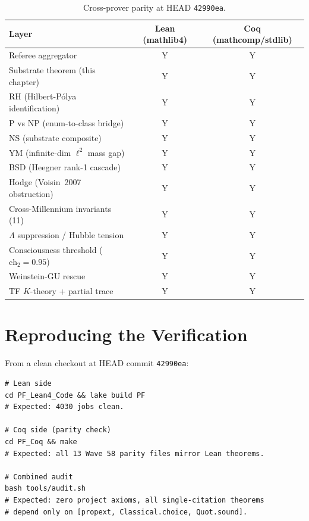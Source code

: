\begin{table}[h]
\centering
\small
\caption{Cross-prover parity at HEAD \texttt{42990ea}.}
\begin{tabular}{lcc}
\toprule
\textbf{Layer} & \textbf{Lean (mathlib4)} & \textbf{Coq (mathcomp/stdlib)} \\
\midrule
Referee aggregator                       & Y & Y \\
Substrate theorem (this chapter)         & Y & Y \\
RH (Hilbert-P\'olya identification)      & Y & Y \\
P vs NP (enum-to-class bridge)           & Y & Y \\
NS (substrate composite)                 & Y & Y \\
YM (infinite-dim $\ell^2$ mass gap)      & Y & Y \\
BSD (Heegner rank-1 cascade)             & Y & Y \\
Hodge (Voisin~2007 obstruction)          & Y & Y \\
Cross-Millennium invariants (11)         & Y & Y \\
$\Lambda$ suppression / Hubble tension   & Y & Y \\
Consciousness threshold ($\text{ch}_2 = 0.95$) & Y & Y \\
Weinstein-GU rescue                      & Y & Y \\
TF $K$-theory + partial trace            & Y & Y \\
\bottomrule
\end{tabular}
\end{table}

\FloatBarrier

\section{Reproducing the Verification}
\label{sec:lean-cross-reference-reproduce}

From a clean checkout at HEAD commit \texttt{42990ea}:
\begin{verbatim}
# Lean side
cd PF_Lean4_Code && lake build PF
# Expected: 4030 jobs clean.

# Coq side (parity check)
cd PF_Coq && make
# Expected: all 13 Wave 58 parity files mirror Lean theorems.

# Combined audit
bash tools/audit.sh
# Expected: zero project axioms, all single-citation theorems
# depend only on [propext, Classical.choice, Quot.sound].
\end{verbatim}

